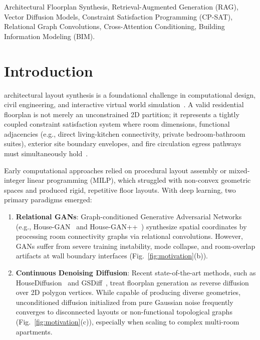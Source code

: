 \documentclass[journal]{IEEEtran}
\begin{document}
\begin{IEEEkeywords}
Architectural Floorplan Synthesis, Retrieval-Augmented Generation (RAG), Vector Diffusion Models, Constraint Satisfaction Programming (CP-SAT), Relational Graph Convolutions, Cross-Attention Conditioning, Building Information Modeling (BIM).
\end{IEEEkeywords}

\section{Introduction}
 architectural layout synthesis is a foundational challenge in computational design, civil engineering, and interactive virtual world simulation~\cite{wu2019data,hu2020graph2plan}. A valid residential floorplan is not merely an unconstrained 2D partition; it represents a tightly coupled constraint satisfaction system where room dimensions, functional adjacencies (e.g., direct living-kitchen connectivity, private bedroom-bathroom suites), exterior site boundary envelopes, and fire circulation egress pathways must simultaneously hold~\cite{nauata2020house,nauata2021house}.

Early computational approaches relied on procedural layout assembly or mixed-integer linear programming (MILP), which struggled with non-convex geometric spaces and produced rigid, repetitive floor layouts. With deep learning, two primary paradigms emerged:
\begin{enumerate}
    \item \textbf{Relational GANs}: Graph-conditioned Generative Adversarial Networks (e.g., House-GAN~\cite{nauata2020house} and House-GAN++~\cite{nauata2021house}) synthesize spatial coordinates by processing room connectivity graphs via relational convolutions. However, GANs suffer from severe training instability, mode collapse, and room-overlap artifacts at wall boundary interfaces (Fig.~\ref{fig:motivation}(b)).
    \item \textbf{Continuous Denoising Diffusion}: Recent state-of-the-art methods, such as HouseDiffusion~\cite{shabani2023housediffusion} and GSDiff~\cite{hu2025gsdiff}, treat floorplan generation as reverse diffusion over 2D polygon vertices. While capable of producing diverse geometries, unconditioned diffusion initialized from pure Gaussian noise frequently converges to disconnected layouts or non-functional topological graphs (Fig.~\ref{fig:motivation}(c)), especially when scaling to complex multi-room apartments.
\end{enumerate}
\end{document}
